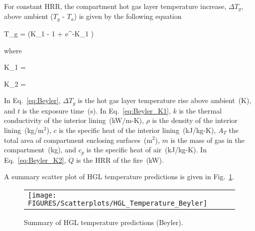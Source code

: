 For constant HRR, the compartment hot gas layer temperature increase, $\Delta T_g$, above ambient ($T_g$ - $T_a$) is given by the following equation

\be
\Delta T_g =  (K_1  - 1 + e^{-K_1 })
\label{eq:Beyler}
\ee

\noindent where

\be
K_1 = 
\label{eq:Beyler_K1}
\ee

\be
K_2 = 
\label{eq:Beyler_K2}
\ee

In Eq.~\ref{eq:Beyler}, $\Delta T_g$ is the hot gas layer temperature rise above ambient~(K), and $t$ is the exposure time~(s). In Eq.~\ref{eq:Beyler_K1}, $k$ is the thermal conductivity of the interior lining~(kW/m-K), $\rho$ is the density of the interior lining~(kg/m$^3$), $c$ is the specific heat of the interior lining~(kJ/kg-K), $A_T$ the total area of compartment enclosing surfaces~(m$^2$), $m$ is the mass of gas in the compartment~(kg), and $c_p$ is the specific heat of air~(kJ/kg-K). In Eq.~\ref{eq:Beyler_K2}, $\dot Q$ is the HRR of the fire~(kW).

\clearpage

A summary scatter plot of HGL temperature predictions is given in Fig.~\ref{hgl_temperature_beyler_summary}. 

\begin{figure}[ht]
\begin{center}
\begin{tabular}{l}
\texttt{[image: FIGURES/Scatterplots/HGL\_Temperature\_Beyler]}
\end{tabular}
\end{center}
\caption[Summary of HGL temperature predictions (Beyler).]
{Summary of HGL temperature predictions (Beyler).}
\label{hgl_temperature_beyler_summary}
\end{figure}

